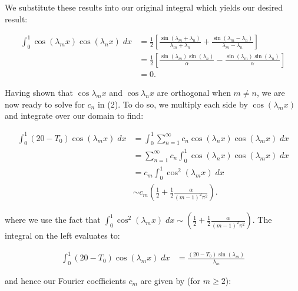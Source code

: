 \begin{solution}
    \pagebreak
    We substitute these results into our original integral which yields our desired result:

    \begin{align*}
        \int_{0}^{1}{\cos{(\lambda_m x)}\cos{(\lambda_n x)}\; dx} &= \frac{1}{2} \left[ \frac{\sin{(\lambda_m + \lambda_n)}}{\lambda_m + \lambda_n} + \frac{\sin{(\lambda_m - \lambda_n)}}{\lambda_m - \lambda_n} \right] \\
                                                                  &= \frac{1}{2} \left[ \frac{\sin{(\lambda_m)} \sin{(\lambda_n)}}{\alpha} - \frac{\sin{(\lambda_m)} \sin{(\lambda_n)}}{\alpha} \right] \\
                                                                  &= 0.
    \end{align*}
    
    Having shown that $\cos{\lambda_m x}$ and $\cos{\lambda_n x}$ are orthogonal when $m \neq n$, we are now ready to solve for $c_n$ in (2).
    To do so, we multiply each side by $\cos{(\lambda_m x)}$ and integrate over our domain to find:

    \begin{align*}
        \int_{0}^{1}{(20 - T_0) \cos{(\lambda_m x)}\; dx} &= \int_{0}^{1}{\sum_{n=1}^{\infty}{c_n \cos{(\lambda_n x)}} \cos{(\lambda_m x)}\; dx} \\
                                                          &= \sum_{n=1}^{\infty}{c_n  \int_{0}^{1}{\cos{(\lambda_n x)} \cos{(\lambda_m x)}\; dx} } \\
                                                          &= c_m \int_{0}^{1}{\cos^2{(\lambda_m x)}\; dx} \\
                                                          &\sim c_m \left(\frac{1}{2} + \frac{1}{2}\frac{\alpha}{(m-1)^2 \pi^2} \right).
    \end{align*}

    where we use the fact that $\int_{0}^{1}{\cos^2{(\lambda_m x)}\; dx} \sim \left(\frac{1}{2} + \frac{1}{2}\frac{\alpha}{(m-1)^2 \pi^2} \right)$.
    The integral on the left evaluates to:

    \begin{align*}
        \int_{0}^{1}{(20 - T_0) \cos{(\lambda_m x)}\; dx} &= \frac{(20 - T_0) \sin{(\lambda_m)}}{\lambda_m}
    \end{align*}

    and hence our Fourier coefficients $c_m$ are given by (for $m \ge 2$):


\end{solution}
